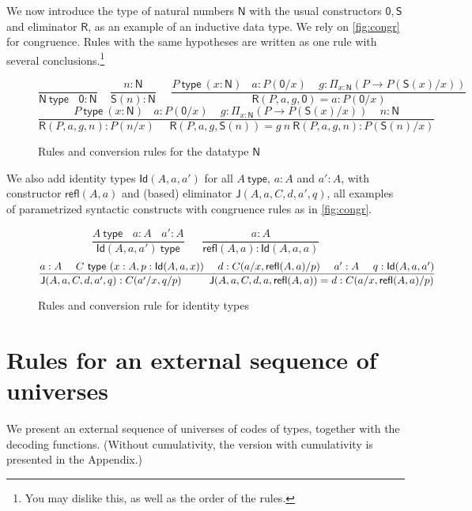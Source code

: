 \documentclass[11pt,a4paper]{article}
\theoremstyle{definition}
\newcommand{\Id}{\mathsf{Id}}
\newcommand{\NN}{\mathsf{N}}
\newcommand{\UU}{\mathsf{U}}
\newcommand{\JJ}{\mathsf{J}}
\newcommand{\ZERO}{\mathsf{0}}
\newcommand{\SUCC}{\mathsf{S}}
\newcommand{\type}{\mathsf{type}}
\newcommand{\mypi}[3]{\Pi_{#1:#2}#3}
\newcommand{\Sapp}[1]{\sapp{\SUCC}{#1}}
\newcommand{\sapp}[2]{{#1(#2)}} %
\newcommand{\Idapp}[3]{\sapp{\Id}{#1,#2,#3}}
\newcommand{\NRapp}[4]{\sapp{\RR}{#1,#2,#3,#4}}
\newcommand{\Rfapp}[2]{\sapp{\refl}{#1,#2}}
\newcommand{\Japp}[6]{\sapp{\JJ}{#1,#2,#3,#4,#5,#6}}
\newcommand{\RR}{\mathsf{R}}
\newcommand{\T}{\mathsf{T}}
\newcommand{\refl}{\mathsf{refl}}
\begin{document}
We now introduce the type of natural numbers $\NN$ with
the usual constructors $\ZERO,\SUCC$ and eliminator $\RR$,
as an example of an inductive data type.
We rely on \cref{fig:congr} for congruence.
Rules with the same hypotheses are written as one rule with
several conclusions.\footnote%
{You may dislike this, as well as the order of the rules.}

\begin{figure}[H]
  \caption{Rules and conversion rules for the datatype $\NN$}\label{fig:typeN}
$$
\frac{}{\NN~\type~~~~\ZERO:\NN}~~~~~
\frac{n:\NN}{\Sapp{n} : \NN}~~~~~~
\frac{P~\type~(x:\NN)~~~~a:P(\ZERO/x)~~~~~
g:\mypi{x}{\NN}{(P\to P(\Sapp{x}/x))}}
{\NRapp{P}{a}{g}{\ZERO} = a: P(\ZERO/x) }
$$
$$
\frac{P~\type~(x:\NN)~~~~a:P(\ZERO/x)~~~~~
g:\mypi{x}{\NN}{(P\to P(\Sapp{x}/x))}~~~~~n:\NN}
{\NRapp{P}{a}{g}{n}:P(n/x)~~~~~~\NRapp{P}{a}{g}{\Sapp{n}} = g~n~\NRapp{P}{a}{g}{n}: P(\Sapp{n}/x) }
$$
\end{figure}

We also add identity types $\Idapp{A}{a}{a'}$ for all $A~\type$,
$a:A$ and $a':A$, with constructor $\Rfapp{A}{a}$ and (based) eliminator
$\Japp{A}{a}{C}{d}{a'}{q}$, all examples of parametrized syntactic constructs
with congruence rules as in \cref{fig:congr}.

\begin{figure}[H]
  \caption{Rules and conversion rule for identity types}\label{fig:typeId}
$$
\frac{A~\type ~~~~ a:A ~~~~ a':A}{\Idapp{A}{a}{a'}~\type}~~~~~~~
\frac{a:A}{\Rfapp{A}{a}:\Idapp{A}{a}{a}}
$$
$$
\frac{a:A~~~~C~\type~(x:A,p:\Idapp{A}{a}{x})~~~~d:C(a/x,\Rfapp{A}{a}/p)
~~~~a':A~~~~q:\Idapp{A}{a}{a'}}
{\Japp{A}{a}{C}{d}{a'}{q}: C(a'/x,q/p) ~~~~~~~~
 \Japp{A}{a}{C}{d}{a}{\Rfapp{A}{a}} = d : C(a/x,\Rfapp{A}{a}/p)}
\belowdisplayshortskip 0pt
$$
\end{figure}


\section{Rules for an external sequence of universes}


We present an external sequence of universes of codes of types, together
with the decoding functions. (Without cumulativity,
the version with cumulativity is presented in the Appendix.)
\end{document}
